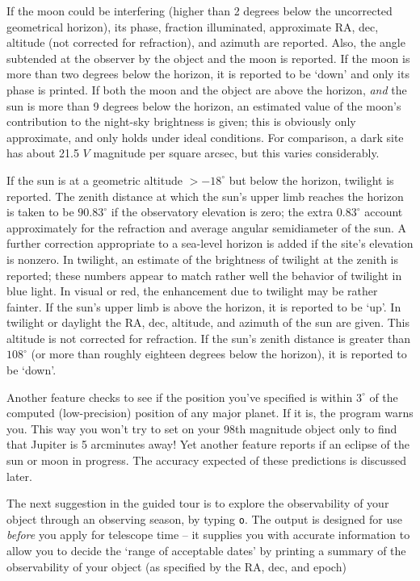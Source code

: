 If the moon could be interfering (higher than 2 degrees below the
uncorrected geometrical horizon), its phase, 
fraction illuminated, approximate RA, dec, altitude (not corrected
for refraction), and azimuth are 
reported.  Also, the angle subtended at the observer by the object 
and the moon is reported.  If the moon is more than two degrees below
the horizon, it is reported to be `down' and only its phase is
printed.  If both the moon and the object are above the horizon, 
{\it and} the sun is more than 9 degrees below the horizon, an
estimated value of the moon's contribution to the night-sky brightness
is given; this is obviously only approximate, and only holds under
ideal conditions.  For comparison, a dark site has about 21.5
$V$ magnitude per square arcsec, but this varies considerably.
\par
If the sun is at a geometric altitude $> -18^{\circ}$ but below the
horizon, twilight is reported.  The zenith distance at which the
sun's upper limb reaches the horizon is taken to be $90.83^{\circ}$
if the observatory elevation is zero; the extra $0.83^{\circ}$
account approximately for the refraction and average angular 
semidiameter of the sun.  A further correction appropriate
to a sea-level horizon is added if the site's elevation is nonzero.
In twilight, an estimate of the brightness of twilight at the 
zenith is reported; these numbers appear to match rather well
the behavior of twilight in blue light.  In visual or red, the 
enhancement due to twilight may be rather fainter.
If the sun's upper limb is above the horizon, 
it is reported to be `up'.  In twilight or daylight 
the RA, dec, altitude, and azimuth of the sun are given.
This altitude is not corrected for refraction.  If the sun's zenith distance
is greater than $108^{\circ}$ (or more than roughly
eighteen degrees below the horizon), it is reported to be `down'.
\par
Another feature checks to see if the position you've specified
is within $3^{\circ}$ of the computed (low-precision) position 
of any major planet.  If it is, the program warns you.  This way
you won't try to set on your 98th magnitude object only to find that Jupiter
is 5 arcminutes away!
Yet another feature reports if an eclipse of the
sun or moon in progress.  The accuracy expected of these predictions
is discussed later.


The next suggestion in the guided tour is to explore the
observability of your object through an observing season,
by typing {\tt o}.  
The output is designed for use {\it before} you apply for telescope time --
it supplies you with accurate information to allow you to decide the
`range of acceptable dates' by printing a summary of the observability
of your object (as specified by the RA, dec, and epoch)


